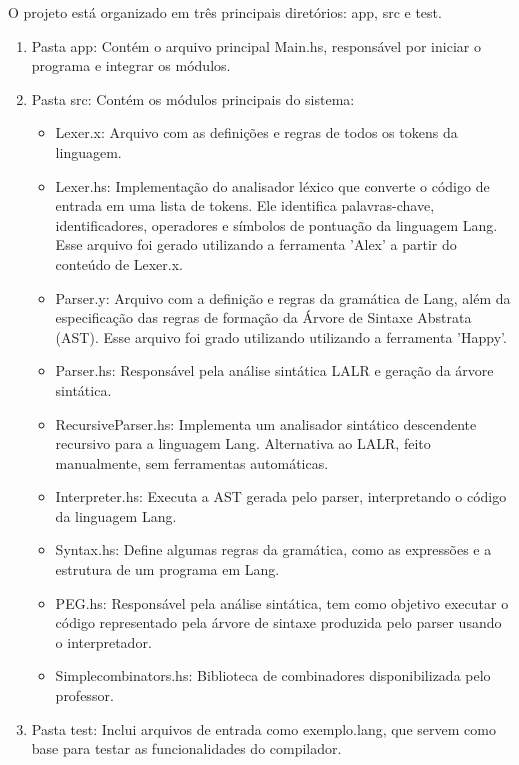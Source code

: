 \documentclass{article}
\begin{document}
O projeto está organizado em três principais diretórios: app, src e test.
\begin{enumerate}
    \item Pasta app: Contém o arquivo principal Main.hs, responsável por iniciar o programa e integrar os módulos. 
    \item Pasta src: Contém os módulos principais do sistema:
        \begin{itemize}
            \item Lexer.x: Arquivo com as definições e regras de todos os tokens da linguagem.
            \item Lexer.hs: Implementação do analisador léxico que converte o código de entrada em uma lista de tokens. Ele identifica palavras-chave, identificadores, operadores e símbolos de pontuação da linguagem Lang. Esse arquivo foi gerado utilizando a ferramenta 'Alex' a partir do conteúdo de Lexer.x.
            \item Parser.y: Arquivo com a definição e regras da gramática de Lang, além da especificação das regras de formação da Árvore de Sintaxe Abstrata (AST). Esse arquivo foi grado utilizando utilizando a ferramenta 'Happy'.
            \item Parser.hs: Responsável pela análise sintática LALR e geração da árvore sintática.
            \item RecursiveParser.hs: Implementa um analisador sintático descendente recursivo para a linguagem Lang. Alternativa ao LALR, feito manualmente, sem ferramentas automáticas.
            \item Interpreter.hs: Executa a AST gerada pelo parser, interpretando o código da linguagem Lang.
            \item Syntax.hs: Define algumas regras da gramática, como as expressões e a estrutura de um programa em Lang.
            \item PEG.hs: Responsável pela análise sintática, tem como objetivo executar o código representado pela árvore de sintaxe produzida pelo parser usando o interpretador.
            \item Simplecombinators.hs: Biblioteca de combinadores disponibilizada pelo professor.
        \end{itemize}

    \item Pasta test: Inclui arquivos de entrada como exemplo.lang, que servem como base para testar as funcionalidades do compilador. 
\end{enumerate}
\end{document}
